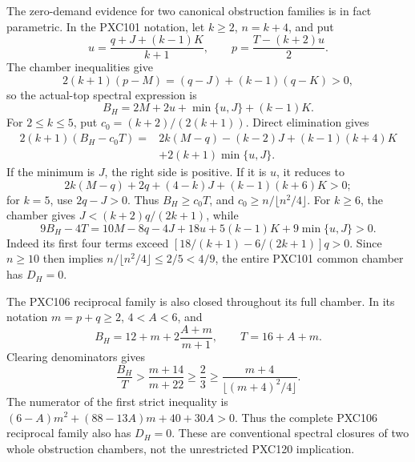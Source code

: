 \documentclass[11pt]{article}
\begin{document}
The zero-demand evidence for two canonical obstruction families is in fact
parametric.  In the PXC101 notation, let \(k\ge2\), \(n=k+4\), and put
\[
 u=\frac{q+J+(k-1)K}{k+1},\qquad
 p=\frac{T-(k+2)u}{2}.
\]
The chamber inequalities give
\[
 2(k+1)(p-M)=(q-J)+(k-1)(q-K)>0,
\]
so the actual-top spectral expression is
\[
 B_H=2M+2u+\min\{u,J\}+(k-1)K.                    \tag{PXC121a}
\]
For \(2\le k\le5\), put \(c_0=(k+2)/(2(k+1))\).  Direct elimination gives
\begin{equation}
\begin{split}
2(k+1)(B_H-c_0T)
={}&2k(M-q)-(k-2)J+(k-1)(k+4)K\\
 &+2(k+1)\min\{u,J\}.
\end{split}
\tag{PXC121b}
\end{equation}
If the minimum is \(J\), the right side is positive.  If it is \(u\), it
reduces to
\[
 2k(M-q)+2q+(4-k)J+(k-1)(k+6)K>0;
\]
for \(k=5\), use \(2q-J>0\).  Thus \(B_H\ge c_0T\), and
\(c_0\ge n/\lfloor n^2/4\rfloor\).  For \(k\ge6\), the chamber gives
\(J<(k+2)q/(2k+1)\), while
\[
 9B_H-4T=10M-8q-4J+18u+5(k-1)K+9\min\{u,J\}>0.   \tag{PXC121c}
\]
Indeed its first four terms exceed
\([18/(k+1)-6/(2k+1)]q>0\).  Since \(n\ge10\) then implies
\(n/\lfloor n^2/4\rfloor\le2/5<4/9\), the entire PXC101 common
chamber has \(D_H=0\).

The PXC106 reciprocal family is also closed throughout its full chamber.  In
its notation \(m=p+q\ge2\), \(4<A<6\), and
\[
 B_H=12+m+2\frac{A+m}{m+1},\qquad T=16+A+m.
\]
Clearing denominators gives
\[
 \frac{B_H}{T}>\frac{m+14}{m+22}\ge\frac23
 \ge\frac{m+4}{\lfloor(m+4)^2/4\rfloor}.            \tag{PXC121d}
\]
The numerator of the first strict inequality is
\((6-A)m^2+(88-13A)m+40+30A>0\).  Thus the complete PXC106
reciprocal family also has \(D_H=0\).  These are conventional spectral
closures of two whole obstruction chambers, not the unrestricted PXC120
implication.
\end{document}
